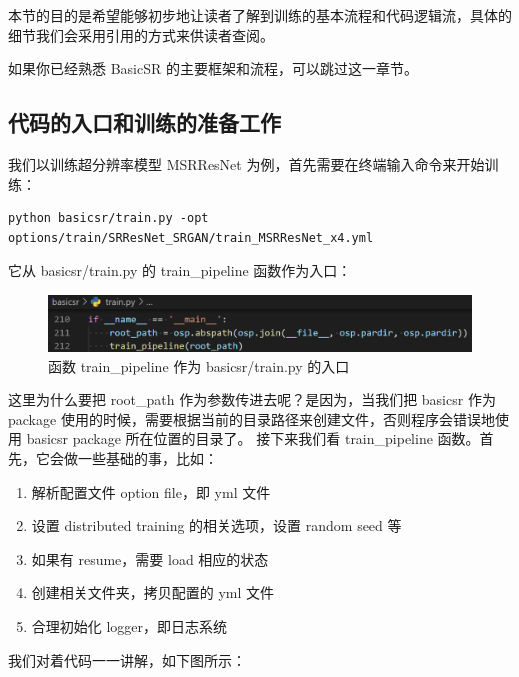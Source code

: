 \documentclass[../main.tex]{subfiles}
\begin{document}
本节的目的是希望能够初步地让读者了解到训练的基本流程和代码逻辑流，具体的细节我们会采用引用的方式来供读者查阅。

如果你已经熟悉 BasicSR 的主要框架和流程，可以跳过这一章节。

\subsection{代码的入口和训练的准备工作}
我们以训练超分辨率模型 MSRResNet 为例，首先需要在终端输入命令来开始训练：

\begin{verbatim}
python basicsr/train.py -opt options/train/SRResNet_SRGAN/train_MSRResNet_x4.yml
\end{verbatim}

它从 basicsr/train.py 的 train\_pipeline 函数作为入口：

\begin{figure}[H]

\begin{center}

    \includegraphics[width=0.7\linewidth]{figures/getting_start_1.png}
    \caption{函数 train\_pipeline 作为 basicsr/train.py 的入口}
    \label{fig:getting_start_1}
\end{center}
\vspace{-0.5cm}
\end{figure}

这里为什么要把 root\_path 作为参数传进去呢？是因为，当我们把 basicsr 作为 package 使用的时候，需要根据当前的目录路径来创建文件，否则程序会错误地使用 basicsr package 所在位置的目录了。
接下来我们看 train\_pipeline 函数。首先，它会做一些基础的事，比如：
\begin{enumerate}

\item 解析配置文件 option file，即 yml 文件
\item 设置 distributed training 的相关选项，设置 random seed 等
\item 如果有 resume，需要 load 相应的状态
\item 创建相关文件夹，拷贝配置的 yml 文件
\item 合理初始化 logger，即日志系统
\end{enumerate}

我们对着代码一一讲解，如下图所示：
\end{document}
